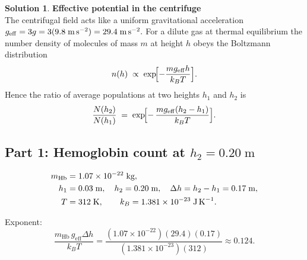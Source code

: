 \documentclass[12pt]{article}
\theoremstyle{definition} %
\newtheorem{solution}{Solution}
\theoremstyle{plain} %
\begin{document}
                            \begin{solution}
                              \textbf{Effective potential in the centrifuge}\\
                              The centrifugal field acts like a uniform gravitational acceleration
                              \(
                              g_{\mathrm{eff}} = 3g = 3(9.8\;\text{m\,s}^{-2}) = 29.4\;\text{m\,s}^{-2}.
                              \)
                              For a dilute gas at thermal equilibrium the number density of molecules of
                              mass \(m\) at height \(h\) obeys the Boltzmann distribution
                              \[
                              n(h) \;\propto\; \exp\!\Bigl[-\frac{m g_{\mathrm{eff}} h}{k_B T}\Bigr].
                              \]
                              Hence the ratio of average populations at two heights \(h_1\) and \(h_2\) is
                              \[
                              \frac{N(h_2)}{N(h_1)}
                                    \;=\;
                                    \exp\!\Bigl[-\,\frac{m g_{\mathrm{eff}}(h_2-h_1)}{k_B T}\Bigr].
                              \]
                              
                              \subsection*{Part 1: Hemoglobin count at \(h_2 = 0.20\;\text{m}\)}
                              
                              \[
                              \begin{aligned}
                              m_{\mathrm{Hb}} &= 1.07\times10^{-22}\;\text{kg},\\
                              h_1 &= 0.03\;\text{m}, \quad
                              h_2 = 0.20\;\text{m}, \quad
                              \Delta h = h_2-h_1 = 0.17\;\text{m},\\
                              T &= 312\;\text{K},\qquad
                              k_B = 1.381\times10^{-23}\;\text{J\,K}^{-1}.
                              \end{aligned}
                              \]
                              
                              Exponent:
                              \[
                              \frac{m_{\mathrm{Hb}}\,g_{\mathrm{eff}}\Delta h}{k_B T}
                              =
                              \frac{(1.07\times10^{-22})(29.4)(0.17)}
                                   {(1.381\times10^{-23})(312)}
                              \approx 0.124.
                              \]
                              

\end{solution}
\end{document}
